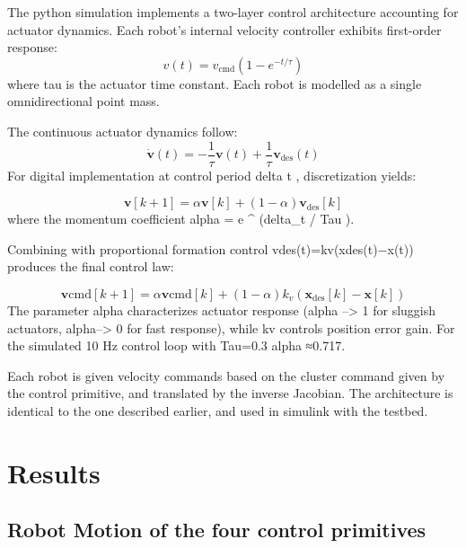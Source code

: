 \documentclass[lettersize,journal]{IEEEtran}
\begin{document}
\noindent The python simulation implements a two-layer control architecture accounting for actuator dynamics. Each robot's internal velocity controller exhibits first-order response:
\begin{equation}
v(t) = v_{\text{cmd}}(1 - e^{-t/\tau})
\end{equation}
where 
tau is the actuator time constant. Each robot is modelled as a single omnidirectional point mass.

The continuous actuator dynamics follow:
\begin{equation}
\dot{\mathbf{v}}(t) = -\frac{1}{\tau}\mathbf{v}(t) + \frac{1}{\tau}\mathbf{v}_{\text{des}}(t)
\label{eq:continuous}
\end{equation}
For digital implementation at control period  delta t , discretization yields:

\begin{equation}
\mathbf{v}[k+1] = \alpha \mathbf{v}[k] + (1-\alpha)\mathbf{v}_{\text{des}}[k]
\label{eq:momentum}
\end{equation}
where the momentum coefficient 
alpha = e ^ (delta_t / Tau ). 

 Combining with proportional formation control vdes​(t)=kv​(xdes​(t)−x(t)) produces the final control law:

\begin{equation}
\mathbf{v}{\text{cmd}}[k+1] = \alpha \mathbf{v}{\text{cmd}}[k] + (1-\alpha)k_v(\mathbf{x}_{\text{des}}[k] - \mathbf{x}[k])
\label{eq:final}
\end{equation}
The parameter alpha
characterizes actuator response (alpha --> 1 for sluggish actuators, alpha--> 0
 for fast response), while kv controls position error gain. For the simulated 10 Hz control loop with Tau=0.3 alpha ≈0.717.

Each robot is given velocity commands based on the cluster command given by the control primitive, and translated by the inverse Jacobian. The architecture is identical to the one described earlier, and used in simulink with the testbed.


 
\section{Results}

\subsection{Robot Motion of the four control primitives}
\end{document}
